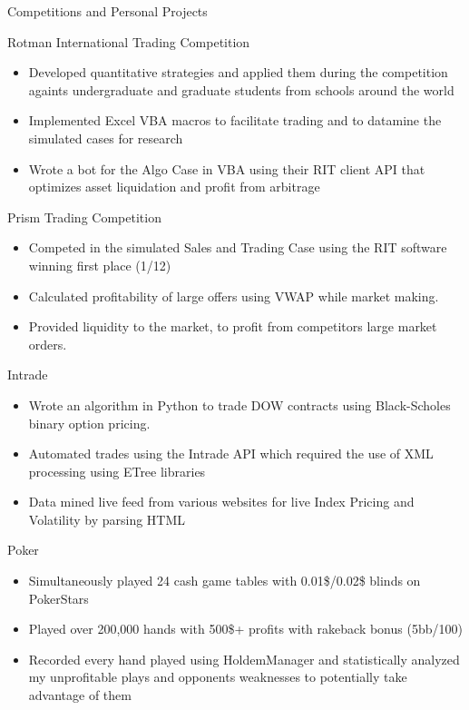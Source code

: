 \documentclass{article}
\newlength{\tabin}
\newlength{\secsep}
\newcommand{\lineunder}{\vspace*{-8pt} \\ \hspace*{-6pt} \hrulefill \\ \vspace*{-15pt}}
\newenvironment{tabbedsection}[1]{
  \begin{list}{}{
      \setlength{\itemsep}{0pt}
      \setlength{\labelsep}{0pt}
      \setlength{\labelwidth}{0pt}
      \setlength{\leftmargin}{\tabin}
      \setlength{\rightmargin}{\tabin}
      \setlength{\listparindent}{0pt}
      \setlength{\parsep}{0pt}
      \setlength{\parskip}{0pt}
      \setlength{\partopsep}{0pt}
      \setlength{\topsep}{#1}
    }
  \item[]
}{\end{list}}
\newenvironment{resume_section}[1]{
  \filbreak
  \vspace{2\secsep}
  \textsc{\large#1}
  \lineunder
  \begin{tabbedsection}{\secsep}
}{\end{tabbedsection}}
\newenvironment{resume_subsection}[2][]{
  \textbf{#2} \hfill {\footnotesize #1} \hspace{2em}
  \begin{tabbedsection}{0.5\secsep}
}{\end{tabbedsection}}
\newenvironment{subitems}{
  \renewcommand{\labelitemi}{-}
  \begin{itemize}
      \setlength{\labelsep}{1em}
}{\end{itemize}}
\begin{document}
\begin{resume_section}{Competitions and Personal Projects}
  \begin{resume_subsection}[(Feburary 2013)]{Rotman International Trading Competition}
  \begin{subitems}
    \item Developed quantitative strategies and applied them during the competition againts undergraduate and graduate students from schools around the world
    \item Implemented Excel VBA macros to facilitate trading and to datamine the simulated cases for research
    \item Wrote a bot for the Algo Case in VBA using their RIT client API that optimizes asset liquidation and profit from arbitrage
    \end{subitems}
  \end{resume_subsection}


  \begin{resume_subsection}[(March 2013)]{Prism Trading Competition}
  \begin{subitems}
    \item Competed in the simulated Sales and Trading Case using the RIT software winning first place (1/12)
    \item Calculated profitability of large offers using VWAP while market making.
    \item Provided liquidity to the market, to profit from competitors large market orders.
    \end{subitems}
  \end{resume_subsection}



  \begin{resume_subsection}[(December 2012)]{Intrade}
    \begin{subitems}
        \item Wrote an algorithm in Python to trade DOW contracts using Black-Scholes binary option pricing.
        \item Automated trades using the Intrade API which required the use of XML processing using ETree libraries
        \item Data mined live feed from various websites for live Index Pricing and Volatility by parsing HTML
    \end{subitems}
  \end{resume_subsection}
  
  \begin{resume_subsection}{Poker}
    \begin{subitems}
    \item Simultaneously played 24 cash game tables with 0.01\$/0.02\$ blinds on PokerStars
    \item Played over 200,000 hands with 500\$+ profits with rakeback bonus (5bb/100)
    \item Recorded every hand played using HoldemManager and statistically analyzed my unprofitable plays and opponents weaknesses to potentially take advantage of them
    \end{subitems}
  \end{resume_subsection}



\end{resume_section}
\end{document}

